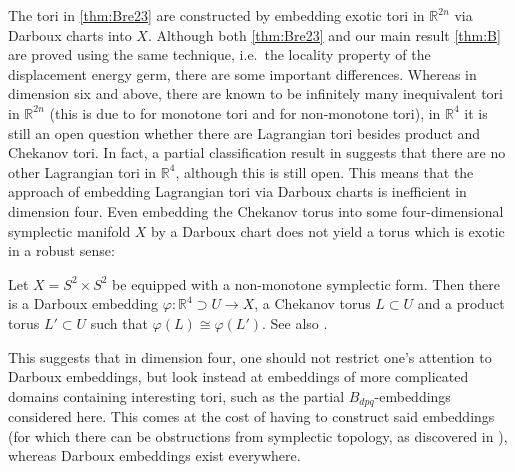 \documentclass[12pt,a4paper,abstract=true,draft]{scrartcl}
\begin{document}
The tori in \cref{thm:Bre23} are constructed by embedding exotic tori in $\mathbb{R}^{2n}$ via Darboux charts into $X$.
Although both \cref{thm:Bre23} and our main result \cref{thm:B} are proved using the same technique, i.e.\ the locality property of the displacement energy germ, there are some important differences.
Whereas in dimension six and above, there are known to be infinitely many inequivalent tori in $\mathbb{R}^{2n}$ (this is due to \cite{Aur15} for monotone tori and \cite{brendel2023local} for non-monotone tori), in $\mathbb{R}^4$ it is still an open question whether there are Lagrangian tori besides product and Chekanov tori.
In fact, a partial classification result in \cite{Riz19} suggests that there are no other Lagrangian tori in $\mathbb{R}^4$, although this is still open.
This means that the approach of embedding Lagrangian tori via Darboux charts is inefficient in dimension four.
Even embedding the Chekanov torus into some four-dimensional symplectic manifold $X$ by a Darboux chart does not yield a torus which is exotic in a robust sense:
 
\begin{remark}
    Let $X = S^2 \times S^2$ be equipped with a non-monotone symplectic form.
Then there is a Darboux embedding $\varphi \colon \mathbb{R}^4 \supset U \rightarrow X$, a Chekanov torus $L \subset U$ and a product torus $L' \subset U$ such that $\varphi(L) \cong \varphi(L')$.
See also \cite[Example 5.6]{brendel2023local}. 
\end{remark}

This suggests that in dimension four, one should not restrict one's attention to Darboux embeddings, but look instead at embeddings of more complicated domains containing interesting tori, such as the partial $B_{dpq}$-embeddings considered here.
This comes at the cost of having to construct said embeddings (for which there can be obstructions from symplectic topology, as discovered in \cite{EvaSmi18}), whereas Darboux embeddings exist everywhere. 
\end{document}
